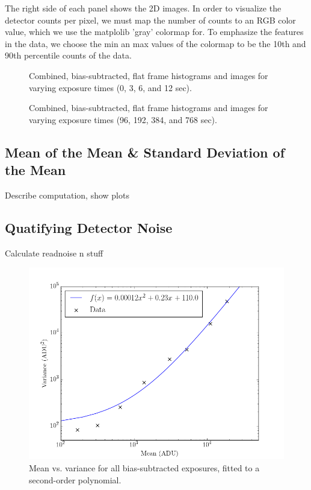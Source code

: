 \documentclass[preprint]{aastex62}
\begin{document}
The right side of each panel shows the 2D images. In order to visualize the detector counts per pixel, we must map the number of counts to an RGB color value, which we use the matplolib 'gray' colormap for. To emphasize the features in the data, we choose the min an max values of the colormap to be the 10th and 90th percentile counts of the data.


\begin{figure}[ht]
\caption{Combined, bias-subtracted, flat frame histograms and images for varying exposure times (0, 3, 6, and 12 sec). \label{fig:flats1}}
\end{figure}
\begin{figure}[ht]
\caption{Combined, bias-subtracted, flat frame histograms and images for varying exposure times (96, 192, 384, and 768 sec). \label{fig:flats2}}
\end{figure}

\subsection{Mean of the Mean \& Standard Deviation of the Mean}
Describe computation, show plots

\subsection{Quatifying Detector Noise}
Calculate readnoise n stuff

\begin{figure}[ht]
\begin{center}
\includegraphics[width=.48\linewidth]{plots/mean_vs_variance.png}
\caption{Mean vs. variance for all bias-subtracted exposures, fitted to a second-order polynomial.} \label{fig:mean_var}
\end{center}
\end{figure}
\end{document}
